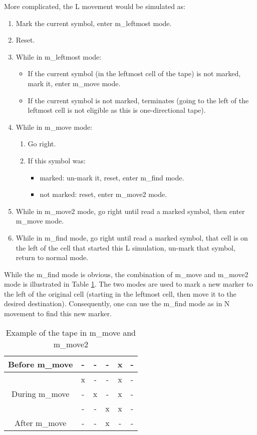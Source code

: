 \documentclass{article}
\begin{document}
More complicated, the L movement would be simulated as:
\begin{enumerate}
    \item Mark the current symbol, enter m\_leftmost mode.
    \item Reset.
    \item While in m\_leftmost mode:
        \begin{itemize}
            \item If the current symbol (in the leftmost cell of the tape) is not marked, mark it, enter m\_move mode.
            \item If the current symbol is not marked, terminates (going to the left of the leftmost cell is not eligible as this is one-directional tape).
        \end{itemize}
    \item While in m\_move mode:
        \begin{enumerate}
            \item Go right.
            \item If this symbol was:
                \begin{itemize}
                    \item marked: un-mark it, reset, enter m\_find mode.
                    \item not marked: reset, enter m\_move2 mode.
                \end{itemize}
        \end{enumerate}
    \item While in m\_move2 mode, go right until read a marked symbol, then enter m\_move mode.
    \item While in m\_find mode, go right until read a marked symbol, that cell is on the left of the cell that started this L simulation, un-mark that symbol, return to normal mode.
\end{enumerate}

While the m\_find mode is obvious, the combination of m\_move and m\_move2 mode is illustrated in Table \ref{table:m_move}. The two modes are used to mark a new marker to the left of the original cell (starting in the leftmost cell, then move it to the desired destination). Consequently, one can use the m\_find mode as in N movement to find this new marker.

\begin{table}
\centering
\begin{tabular}{ |c|c|c|c|c|c }
 \hline
  Before m\_move & - & - & - & x & - \\
 \hline
  \multirow{3}{4em}{During m\_move} & x & - & - & x & - \\
 \cline{2-6}
  & - & x & - & x & - \\
 \cline{2-6}
  & - & - & x & x & - \\
 \hline
  After m\_move & - & - & x & - & - \\
 \hline
\end{tabular}
\caption{Example of the tape in m\_move and m\_move2}
\label{table:m_move}
\end{table}
\end{document}

